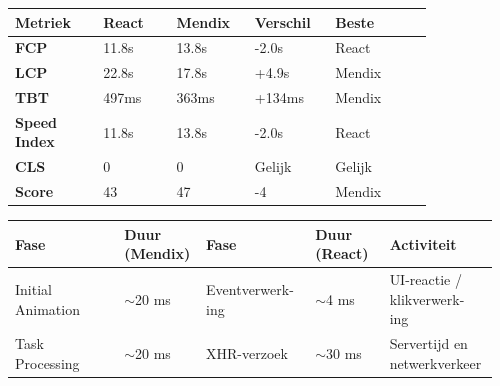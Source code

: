 \documentclass[a0,portrait]{hogent-poster}
\begin{document}
\begin{multicols}{2}
        \begin{center}
            \begin{minipage}{0.48\linewidth}
                \centering
                \scriptsize
                \renewcommand{\arraystretch}{1.2}
                \begin{tabular}{|p{0.18\linewidth}|p{0.15\linewidth}|p{0.15\linewidth}|p{0.15\linewidth}|p{0.2\linewidth}|}
                    \hline
                    \textbf{Metriek} & \textbf{React} & \textbf{Mendix} & \textbf{Verschil} & \textbf{Beste}\\
                    \hline
                    \textbf{FCP} & 11.8s & 13.8s & -2.0s & React \\
                    \hline
                    \textbf{LCP} & 22.8s & 17.8s & +4.9s & Mendix \\
                    \hline
                    \textbf{TBT} & 497ms & 363ms & +134ms & Mendix \\
                    \hline
                    \textbf{Speed Index} & 11.8s & 13.8s & -2.0s & React \\
                    \hline
                    \textbf{CLS} & 0 & 0 & Gelijk & Gelijk \\
                    \hline
                    \textbf{Score} & 43 & 47 & -4 & Mendix \\
                    \hline
                \end{tabular}
            \end{minipage}
            \hspace{0.02\linewidth}
            \begin{minipage}{0.48\linewidth}
                \centering
                \scriptsize
                \renewcommand{\arraystretch}{1.2}
                \begin{tabular}{|p{0.22\linewidth}|p{0.15\linewidth}|p{0.22\linewidth}|p{0.15\linewidth}|p{0.22\linewidth}|}
                    \hline
                    \textbf{Fase} & \textbf{Duur (Mendix)} & \textbf{Fase} & \textbf{Duur \newline (React)} & \textbf{Activiteit} \\
                    \hline
                    Initial \newline Animation & $\sim$20 ms & Eventverwerk- ing & $\sim$4 ms & UI-reactie / klikverwerk- ing \\
                    \hline
                    Task \newline Processing & $\sim$20 ms & XHR-verzoek & $\sim$30 ms & Servertijd en netwerkverkeer \\

\end{tabular}
\end{minipage}
\end{center}
\end{multicols}
\end{document}
